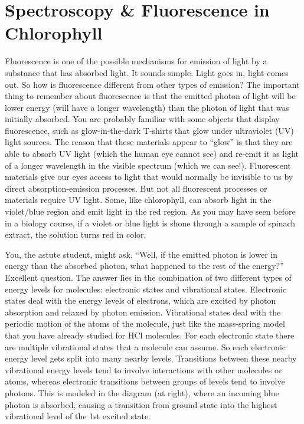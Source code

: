 \chapter{Spectroscopy \& Fluorescence in Chlorophyll}
\thispagestyle{fancy}
%
Fluorescence is one of the possible mechanisms for emission of light by a substance that has absorbed light. 
It sounds simple. 
Light goes in, light comes out. 
So how is fluorescence different from other types of emission? 
The important thing to remember about fluorescence is that the emitted photon of light will be lower energy (will have a longer wavelength) than the photon of light that was initially absorbed. 
You are probably familiar with some objects that display fluorescence, such as glow-in-the-dark T-shirts that glow under ultraviolet (UV) light sources. 
The reason that these materials appear to “glow” is that they are able to absorb UV light (which the human eye cannot see) and re-emit it as light of a longer wavelength in the visible spectrum (which we can see!). 
Fluorescent materials give our eyes access to light that would normally be invisible to us by direct absorption-emission processes. 
But not all fluorescent processes or materials require UV light. 
Some, like chlorophyll, can absorb light in the violet/blue region and emit light in the red region. 
As you may have seen before in a biology course, if a violet or blue light is shone through a sample of spinach extract, the solution turns red in color.
\par
You, the astute student, might ask, “Well, if the emitted photon is lower in energy than the absorbed photon, what happened to the rest of the energy?” 
Excellent question. 
The answer lies in the combination of two different types of energy levels for molecules: electronic states and vibrational states. 
Electronic states deal with the energy levels of electrons, which are excited by photon absorption and relaxed by photon emission. 
Vibrational states deal with the periodic motion of the atoms of the molecule, just like the mass-spring model that you have already studied for HCl molecules. 
For each electronic state there are multiple vibrational states that a molecule can assume. 
So each electronic energy level gets split into many nearby levels. 
Transitions between these nearby vibrational energy levels tend to involve interactions with other molecules or atoms, whereas electronic transitions between groups of levels tend to involve photons. 
This is modeled in the diagram (at right), where an incoming blue photon is absorbed, causing a transition from ground state into the highest vibrational level of the 1st excited state. 
